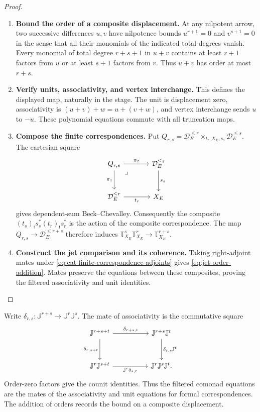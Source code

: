 \documentclass[11pt,a4paper]{article}
\numberwithin{algorithm}{section}
\numberwithin{equation}{section}
\theoremstyle{definition}
\theoremstyle{remark}
\theoremstyle{plain}
\theoremstyle{definition}
\theoremstyle{plain}
\begin{document}
\begin{proof}\leavevmode
\begin{enumerate}[leftmargin=*,align=left]
\item \textbf{Bound the order of a composite displacement.}
At any nilpotent arrow, two successive differences $u,v$ have
nilpotence bounds $u^{r+1}=0$ and $v^{s+1}=0$ in the sense that
all their monomials of the indicated total degrees vanish.  Every
monomial of total degree $r+s+1$ in $u+v$ contains at least
$r+1$ factors from $u$ or at least $s+1$ factors from $v$.
Thus $u+v$ has order at most $r+s$.

\item \textbf{Verify units, associativity, and vertex interchange.}
This defines the displayed
map, naturally in the stage.  The unit is displacement zero,
associativity is $(u+v)+w=u+(v+w)$, and vertex interchange
sends $u$ to $-u$.  These polynomial equations commute with
all truncation maps.

\item \textbf{Compose the finite correspondences.}
Put
$Q_{r,s}=\mathcal D_E^{\le r}\times_{t_r,X_E,s_s}\mathcal D_E^{\le s}$.
The cartesian square
\[
\begin{tikzcd}[column sep=large,row sep=large]
 Q_{r,s} \arrow[dr,phantom,"\lrcorner",very near start] \arrow[r,"{\pi_2}"] \arrow[d,"{\pi_1}"']
   & \mathcal D_E^{\le s} \arrow[d,"{s_s}"]\\
 \mathcal D_E^{\le r} \arrow[r,"{t_r}"'] & X_E
\end{tikzcd}
\]
gives dependent-sum Beck--Chevalley.  Consequently the composite
$(t_s)_!s_s^*(t_r)_!s_r^*$ is the action of the composite
correspondence.  The map $Q_{r,s}\to\mathcal D_E^{\le r+s}$
therefore induces
$\mathbb T_{X_E}^s\mathbb T_{X_E}^r\to\mathbb T_{X_E}^{r+s}$.

\item \textbf{Construct the jet comparison and its coherence.}
Taking right-adjoint mates under
\eqref{eq:cat-finite-correspondence-adjoints} gives
\eqref{eq:jet-order-addition}.  Mates preserve the equations
between these composites, proving the filtered associativity
and unit identities.
\end{enumerate}
\end{proof}


Write $\delta_{r,s}:\mathbb J^{r+s}\to\mathbb J^r\mathbb J^s$.
The mate of associativity is the commutative square
\begin{equation}\label{eq:cat-filtered-jet-coherence}
\begin{tikzcd}[column sep=5em,row sep=3em]
 \mathbb J^{r+s+t} \arrow[r,"{\delta_{r+s,t}}"]
   \arrow[d,"{\delta_{r,s+t}}"']
   & \mathbb J^{r+s}\mathbb J^t
       \arrow[d,"{\delta_{r,s}\mathbb J^t}"]\\
 \mathbb J^r\mathbb J^{s+t}
   \arrow[r,"{\mathbb J^r\delta_{s,t}}"']
   & \mathbb J^r\mathbb J^s\mathbb J^t .
\end{tikzcd}
\end{equation}
Order-zero factors give the counit identities. Thus the
filtered comonad equations are the mates of the associativity
and unit equations for formal correspondences. The addition
of orders records the bound on a composite displacement.
\end{document}
